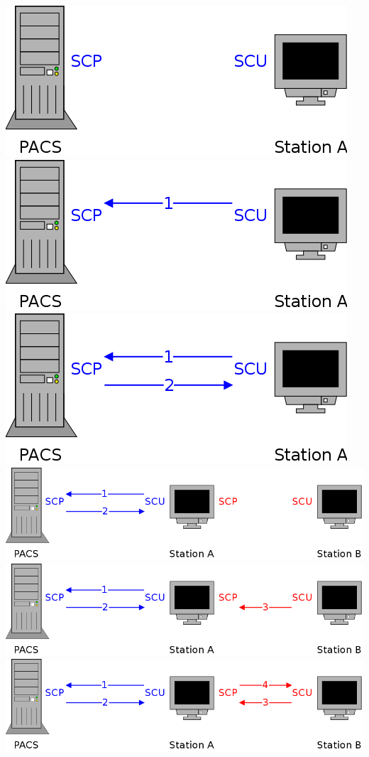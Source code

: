{%
	\includegraphics[width=.6\linewidth]{./figures/roles-scu.png}
	\includegraphics[width=.6\linewidth]{./figures/roles-1.png}
	\includegraphics[width=.6\linewidth]{./figures/roles-2.png}
	\includegraphics[width=\linewidth]{./figures/roles-scp.png}
	\includegraphics[width=\linewidth]{./figures/roles-3.png}
	\includegraphics[width=\linewidth]{./figures/roles-4.png}
}

